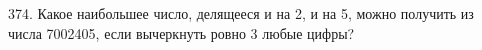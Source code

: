 374. Какое наибольшее число, делящееся и на 2, и на 5, можно получить из числа 7002405, если
вычеркнуть ровно 3 любые цифры?\\
